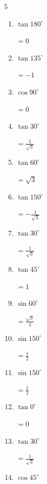 \begin{multicols}{5}
\begin{enumerate}
  \item $\displaystyle \tan{180^\circ}$

        $\displaystyle =0$

  \item $\displaystyle \tan{135^\circ}$

        $\displaystyle =-1$

  \item $\displaystyle \cos{90^\circ}$

        $\displaystyle =0$

  \item $\displaystyle \tan{30^\circ}$

        $\displaystyle =\frac{1}{\sqrt{3}}$

  \item $\displaystyle \tan{60^\circ}$

        $\displaystyle =\sqrt{3}$

  \item $\displaystyle \tan{150^\circ}$

        $\displaystyle =-\frac{1}{\sqrt{3}}$

  \item $\displaystyle \tan{30^\circ}$

        $\displaystyle =\frac{1}{\sqrt{3}}$

  \item $\displaystyle \tan{45^\circ}$

        $\displaystyle =1$

  \item $\displaystyle \sin{60^\circ}$

        $\displaystyle =\frac{\sqrt{3}}{2}$

  \item $\displaystyle \sin{150^\circ}$

        $\displaystyle =\frac{1}{2}$

  \item $\displaystyle \sin{150^\circ}$

        $\displaystyle =\frac{1}{2}$

  \item $\displaystyle \tan{0^\circ}$

        $\displaystyle =0$

  \item $\displaystyle \tan{30^\circ}$

        $\displaystyle =\frac{1}{\sqrt{3}}$

  \item $\displaystyle \cos{45^\circ}$


\end{enumerate}
\end{multicols}
